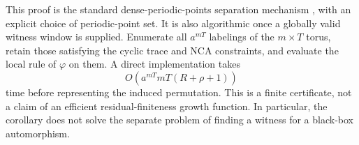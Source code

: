This proof is the standard dense-periodic-points separation mechanism
\citep{ceccherini2012,salo2026residual}, with an explicit choice of periodic-point set.  It is also algorithmic once a globally valid witness window is supplied.  Enumerate all $a^{mT}$ labelings of the $m\times T$ torus, retain those satisfying the cyclic trace and NCA constraints, and evaluate the local rule of $\varphi$ on them.  A direct implementation takes
\[
 O\!\left(a^{mT}mT(R+\rho+1)\right)
\]
time before representing the induced permutation.  This is a finite certificate, not a claim of an efficient residual-finiteness growth function.  In particular, the corollary does not solve the separate problem of finding a witness for a black-box automorphism.
